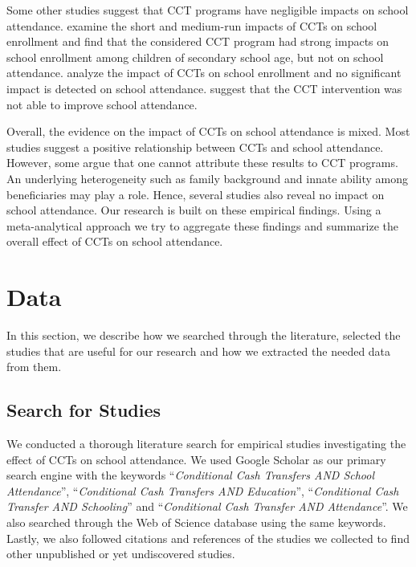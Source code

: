 \documentclass[a4paper, 10pt]{article}
\begin{document}
Some other studies suggest that CCT programs have negligible impacts on school attendance. \cite{Armand2018} examine the short and medium-run impacts of CCTs on school enrollment and find that the considered CCT program had strong impacts on school enrollment among children of secondary school age, but not on school attendance. \cite{Borraz2009} analyze the impact of CCTs on school enrollment and no significant impact is detected on school attendance. \cite{Ferre2014} suggest that the CCT intervention was not able to improve school attendance.

Overall, the evidence on the impact of CCTs on school attendance is mixed. Most studies suggest a positive relationship between CCTs and school attendance. However, some argue that one cannot attribute these results to CCT programs. An underlying heterogeneity such as family background and innate ability among beneficiaries may play a role. Hence, several studies also reveal no impact on school attendance. Our research is built on these empirical findings. Using a meta-analytical approach we try to aggregate these findings and summarize the overall effect of CCTs on school attendance.

\section{Data} \label{sec:data}

In this section, we describe how we searched through the literature, selected the studies that are useful for our research and how we extracted the needed data from them.

\subsection{Search for Studies}


We conducted a thorough literature search for empirical studies investigating the effect of CCTs on school attendance. We used Google Scholar as our primary search engine with the keywords ``\textit{Conditional Cash Transfers AND School Attendance}'', ``\textit{Conditional Cash Transfers AND Education}'', ``\textit{Conditional Cash Transfer AND Schooling}'' and ``\textit{Conditional Cash Transfer AND Attendance}''. We also searched through the Web of Science database using the same keywords. Lastly, we also followed citations and references of the studies we collected to find other unpublished or yet undiscovered studies.
\end{document}

